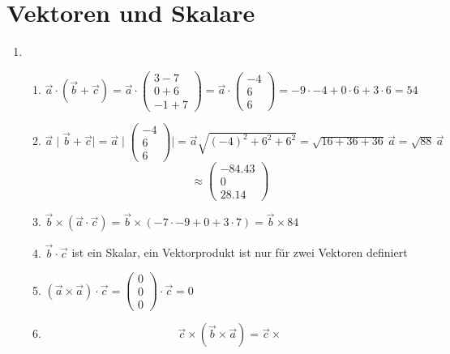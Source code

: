 \documentclass[sectionformat = Aufgabe]{gadsescript}
\begin{document}
\maketitle
\section{Vektoren und Skalare}
\begin{enumerate}[label=\alph*)]
	\item ~
		\begin{enumerate}[label=\roman*)]
			\item $\vec a \cdot ( \vec b + \vec c) = \vec a \cdot \begin{pmatrix}3-7\\0+6\\-1+7\end{pmatrix} = \vec a \cdot \begin{pmatrix} -4\\6\\6\end{pmatrix} = -9 \cdot -4 + 0 \cdot 6 + 3 \cdot 6 = 54 $\\%
			\item $ \vec a \mid \vec b + \vec c \mid = \vec a
				\mid\begin{pmatrix}-4\\6\\6\end{pmatrix}\mid 
				= \vec a \sqrt{(-4)^2 + 6^2 + 6^2} = \sqrt{16 + 36 + 36} \,\vec a = \sqrt{88} \, \vec a $\\
				\[ \approx \begin{pmatrix}\num{-84.43}\\\num{0}\\\num{28.14}\end{pmatrix}\]%
			\item $ \vec b \times ( \vec a \cdot \vec c ) = \vec b \times ( -7 \cdot -9 + 0 + 3 \cdot 7 ) = \vec b \times 84 $ \Lightning%
			\item $ \vec b \cdot \vec c $ ist ein Skalar, ein Vektorprodukt ist nur für zwei Vektoren definiert \Lightning
			\item $ (\vec a \times \vec a) \cdot \vec c = \begin{pmatrix}0\\0\\0\end{pmatrix} \cdot \vec c = 0 $%
				\item \[ \vec c \times ( \vec b \times \vec a ) = \vec c \times
\]
\end{enumerate}
\end{enumerate}
\end{document}
